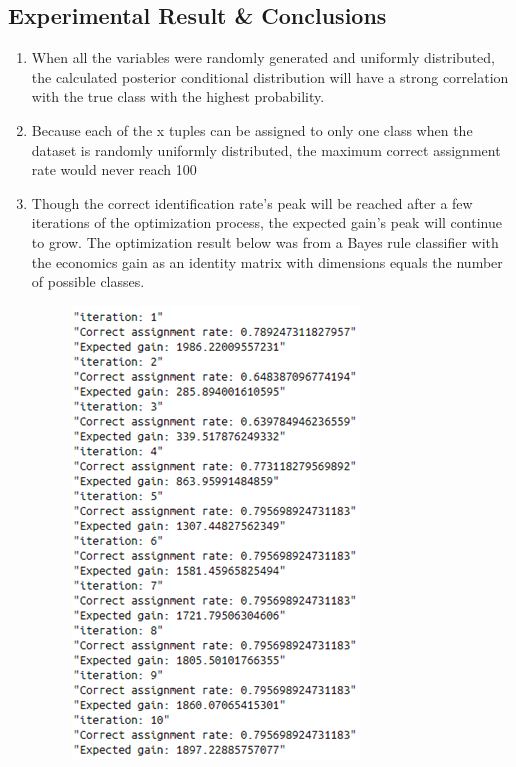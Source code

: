 \documentclass{article}
\begin{document}
\begin{multicols}{2}
    \section{Experimental Result \& Conclusions}
        \begin{enumerate}
            \item When all the variables were randomly generated and uniformly distributed, the calculated posterior conditional distribution will have a strong correlation with the true class with the highest probability.
            \item Because each of the x tuples can be assigned to only one class when the dataset is randomly uniformly distributed, the maximum correct assignment rate would never reach 100%
            \item Though the correct identification rate's peak will be reached after a few iterations of the optimization process, the expected gain's peak will continue to grow. The optimization result below was from a Bayes rule classifier with the economics gain as an identity matrix with dimensions equals the number of possible classes.
            \begin{figure}[H]
                \centering 
                \includegraphics[width=\linewidth]{fig12.png}

\end{figure}
\end{enumerate}
\end{multicols}
\end{document}
